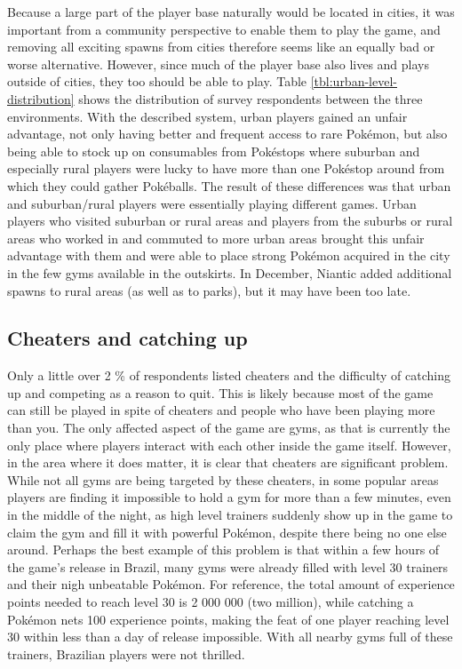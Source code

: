 Because a large part of the player base naturally would be located in cities, it was important from a community perspective to enable them to play the game, and removing all exciting spawns from cities therefore seems like an equally bad or worse alternative. However, since much of the player base also lives and plays outside of cities, they too should be able to play. Table \ref{tbl:urban-level-distribution} shows the distribution of survey respondents between the three environments. With the described system, urban players gained an unfair advantage, not only having better and frequent access to rare Pokémon, but also being able to stock up on consumables from Pokéstops where suburban and especially rural players were lucky to have more than one Pokéstop around from which they could gather Pokéballs. The result of these differences was that urban and suburban/rural players were essentially playing different games. Urban players who visited suburban or rural areas and players from the suburbs or rural areas who worked in and commuted to more urban areas brought this unfair advantage with them and were able to place strong Pokémon acquired in the city in the few gyms available in the outskirts. In December, Niantic added additional spawns to rural areas (as well as to parks), but it may have been too late. 


\subsection{Cheaters and catching up}
\label{sec:cheaters-analysis}
Only a little over 2 \% of respondents listed cheaters and the difficulty of catching up and competing as a reason to quit. This is likely because most of the game can still be played in spite of cheaters and people who have been playing more than you. The only affected aspect of the game are gyms, as that is currently the only place where players interact with each other inside the game itself. However, in the area where it does matter, it is clear that cheaters are significant problem. While not all gyms are being targeted by these cheaters, in some popular areas players are finding it impossible to hold a gym for more than a few minutes, even in the middle of the night, as high level trainers suddenly show up in the game to claim the gym and fill it with powerful Pokémon, despite there being no one else around. Perhaps the best example of this problem is that within a few hours of the game's release in Brazil, many gyms were already filled with level 30 trainers and their nigh unbeatable Pokémon. For reference, the total amount of experience points needed to reach level 30 is 2 000 000 (two million), while catching a Pokémon nets 100 experience points, making the feat of one player reaching level 30 within less than a day of release impossible. With all nearby gyms full of these trainers, Brazilian players were not thrilled.

